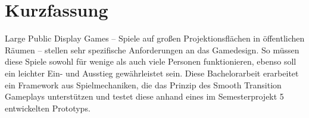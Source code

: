 \chapter{Kurzfassung}

Large Public Display Games -- Spiele auf großen Projektionsflächen in öffentlichen Räumen -- stellen sehr spezifische Anforderungen an das Gamedesign. So müssen diese Spiele sowohl für wenige als auch viele Personen funktionieren, ebenso soll ein leichter Ein- und Ausstieg gewährleistet sein. Diese Bachelorarbeit erarbeitet ein Framework aus Spielmechaniken, die das Prinzip des Smooth Transition Gameplays unterstützen und testet diese anhand eines im Semesterprojekt 5 entwickelten Prototyps.
